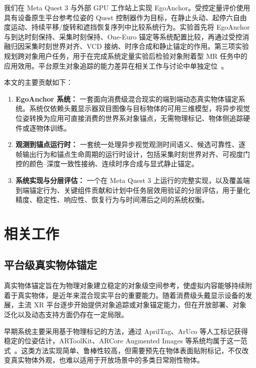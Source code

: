 \documentclass[9pt,twocolumn,letterpaper]{extarticle}
\begin{document}
我们在 Meta Quest 3 与外部 GPU 工作站上实现 EgoAnchor。受控定量评价使用具有设备原生平台参考位姿的 Quest 控制器作为目标，在静止头动、起停六自由度运动、持续平移/旋转和遮挡恢复序列中比较系统行为。实验首先将 EgoAnchor 与到达时刻保持、采集时刻保持、One-Euro 锚定等系统配置比较，再通过受控消融归因采集时刻世界对齐、VCD 接纳、时序合成和静止锚定的作用。第三项实验规划跨对象用户任务，用于在完成系统定量实验后检验对象附着型 MR 任务中的应用效用。平台原生对象追踪的能力差异在相关工作与讨论中单独定位~\cite{appleObjectAnchor,azureObjectAnchors,metaDynamicObjectTracker}。

本文的主要贡献如下：

\begin{enumerate}
  \item \textbf{EgoAnchor 系统：} 一套面向消费级混合现实的端到端动态真实物体锚定系统。系统仅依赖头戴显示器双目图像与目标物体的可用三维模型，将异步视觉位姿转换为应用可直接消费的世界系对象锚点，无需物理标记、物体侧追踪硬件或逐物体训练。
  \item \textbf{观测到锚点运行时：} 一套统一处理异步视觉观测时间语义、候选可靠性、逐帧输出行为和锚点生命周期的运行时设计，包括采集时刻世界对齐、可视度门控的颜色--深度一致性接纳、连续时序合成与显式静止锚定。
  \item \textbf{系统实现与分层评估：} 一个在 Meta Quest 3 上运行的完整实现，以及覆盖端到端锚定行为、关键组件贡献和计划中任务层效用验证的分层评估，用于量化精度、稳定性、响应性、恢复行为与时间滞后之间的系统权衡。
\end{enumerate}

\section{相关工作}\label{sec:related-work}


\subsection{平台级真实物体锚定}


真实物体锚定旨在为物理对象建立稳定的对象级空间参考，使虚拟内容能够持续附着于真实物体，是近年来混合现实平台的重要能力。随着消费级头戴显示设备的发展，主流 XR 平台逐步开始提供对象追踪或对象锚定能力，但在开放部署、对象泛化以及动态支持方面仍存在一定局限。

早期系统主要采用基于物理标记的方法，通过 AprilTag、ArUco 等人工标记获得稳定的位姿估计，ARToolKit、ARCore Augmented Images 等系统均属于这一范式~\cite{kato1999artoolkit,olson2011apriltag,garridojurado2014aruco,googleArcoreAugmentedImages}。这类方法实现简单、鲁棒性较高，但需要预先在物体表面贴附标记，不仅改变真实物体外观，也难以适用于开放场景中的多类日常刚性物体。
\end{document}
